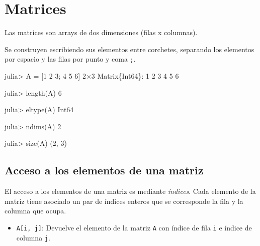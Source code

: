 \documentclass[
  letterpaper,
  DIV=11,
  numbers=noendperiod]{scrreprt}
\newenvironment{Shaded}{\begin{snugshade}}{\end{snugshade}}
\newcommand{\DataTypeTok}[1]{\textcolor[rgb]{0.68,0.00,0.00}{#1}}
\newcommand{\FloatTok}[1]{\textcolor[rgb]{0.68,0.00,0.00}{#1}}
\newcommand{\FunctionTok}[1]{\textcolor[rgb]{0.28,0.35,0.67}{#1}}
\newcommand{\NormalTok}[1]{\textcolor[rgb]{0.00,0.23,0.31}{#1}}
\newcommand{\OperatorTok}[1]{\textcolor[rgb]{0.37,0.37,0.37}{#1}}
\providecommand{\tightlist}{%
  \setlength{\itemsep}{0pt}\setlength{\parskip}{0pt}}\usepackage{longtable,booktabs,array}
\begin{document}
\hypertarget{matrices}{%
\section{Matrices}\label{matrices}}

Las matrices son arrays de dos dimensiones (filas x columnas).

Se construyen escribiendo sus elementos entre corchetes, separando los
elementos por espacio y las filas por punto y coma \texttt{;}.

\begin{Shaded}
\begin{Highlighting}[]
\NormalTok{julia}\OperatorTok{\textgreater{}}\NormalTok{ A }\OperatorTok{=}\NormalTok{ [}\FloatTok{1} \FloatTok{2} \FloatTok{3}\NormalTok{; }\FloatTok{4} \FloatTok{5} \FloatTok{6}\NormalTok{]}
\FloatTok{2}\OperatorTok{×}\FloatTok{3} \DataTypeTok{Matrix}\NormalTok{\{}\DataTypeTok{Int64}\NormalTok{\}}\OperatorTok{:}
 \FloatTok{1}  \FloatTok{2}  \FloatTok{3}
 \FloatTok{4}  \FloatTok{5}  \FloatTok{6}

\NormalTok{julia}\OperatorTok{\textgreater{}} \FunctionTok{length}\NormalTok{(A)}
\FloatTok{6}

\NormalTok{julia}\OperatorTok{\textgreater{}} \FunctionTok{eltype}\NormalTok{(A)}
\DataTypeTok{Int64}

\NormalTok{julia}\OperatorTok{\textgreater{}} \FunctionTok{ndims}\NormalTok{(A)}
\FloatTok{2}

\NormalTok{julia}\OperatorTok{\textgreater{}} \FunctionTok{size}\NormalTok{(A)}
\NormalTok{(}\FloatTok{2}\NormalTok{, }\FloatTok{3}\NormalTok{)}
\end{Highlighting}
\end{Shaded}

\hypertarget{acceso-a-los-elementos-de-una-matriz}{%
\subsection{Acceso a los elementos de una
matriz}\label{acceso-a-los-elementos-de-una-matriz}}

El acceso a los elementos de una matriz es mediante \emph{índices}. Cada
elemento de la matriz tiene asociado un par de índices enteros que se
corresponde la fila y la columna que ocupa.

\begin{itemize}
\tightlist
\item
  \texttt{A{[}i,\ j{]}}: Devuelve el elemento de la matriz \texttt{A}
  con índice de fila \texttt{i} e índice de columna \texttt{j}.
\end{itemize}
\end{document}
